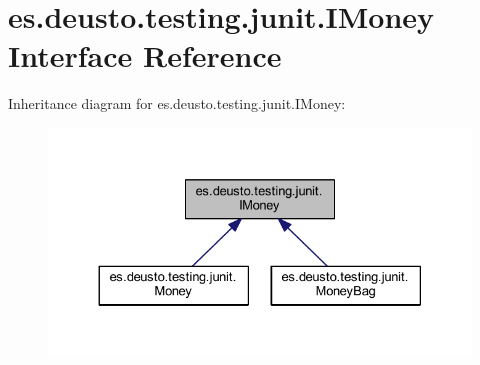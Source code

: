 \hypertarget{interfacees_1_1deusto_1_1testing_1_1junit_1_1_i_money}{}\section{es.\+deusto.\+testing.\+junit.\+I\+Money Interface Reference}
\label{interfacees_1_1deusto_1_1testing_1_1junit_1_1_i_money}


Inheritance diagram for es.\+deusto.\+testing.\+junit.\+I\+Money\+:
\nopagebreak
\begin{figure}[H]
\begin{center}
\leavevmode
\includegraphics[width=330pt]{interfacees_1_1deusto_1_1testing_1_1junit_1_1_i_money__inherit__graph}
\end{center}
\end{figure}
